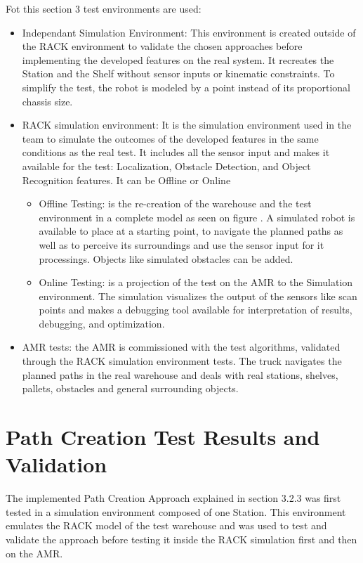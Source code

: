 Fot this section 3 test environments are used:
\begin{itemize}
    \item Independant Simulation Environment: This environment is created outside of the RACK 
    environment to validate the chosen approaches before implementing the developed features 
    on the real system. It recreates the Station and the Shelf without sensor inputs or kinematic constraints.
    To simplify the test, the robot is modeled by a point instead of its proportional chassis size.

    \item RACK simulation environment: It is the simulation environment used in the team to simulate 
    the outcomes of the developed features in the same conditions as the real test. It includes all the sensor 
    input and makes it available for the test: Localization, Obstacle Detection, and Object Recognition features.
    It can be Offline or Online
    \begin{itemize}
        \item Offline Testing: is the re-creation of the warehouse and the test environment in a complete model
        as seen on figure . A simulated robot is available to place at a starting point, 
        to navigate the planned paths as well
        as to perceive its surroundings and use the sensor input for it processings. Objects like simulated 
        obstacles can be added. 
        \item Online Testing: is a projection of the test on the AMR to the Simulation environment.
        The simulation visualizes the output of the sensors like scan points and makes a debugging 
        tool available for interpretation of results, debugging, and optimization.
    \end{itemize}

    \item AMR tests: the AMR is commissioned with the test algorithms, validated through the RACK simulation
    environment tests. The truck navigates the planned paths in the real warehouse and deals with real stations, 
    shelves, pallets, obstacles and general surrounding objects.
\end{itemize}

\section{Path Creation Test Results and Validation}
The implemented Path Creation Approach explained in section 3.2.3 was first tested in a simulation environment
composed of one Station. This environment emulates the RACK model of the test warehouse and was used to test 
and validate the approach before testing it inside the RACK simulation first and then on the AMR.

